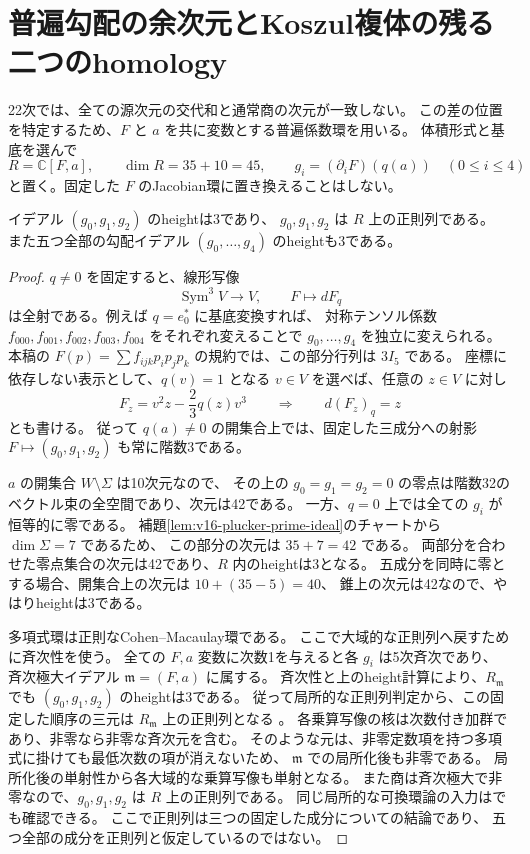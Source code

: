 \section{普遍勾配の余次元とKoszul複体の残る二つのhomology}
\label{sec:v16-universal-koszul-height}

22次では、全ての源次元の交代和と通常商の次元が一致しない。
この差の位置を特定するため、$F$ と $a$ を共に変数とする普遍係数環を用いる。
体積形式と基底を選んで
\[
 R=\mathbb C[F,a],\qquad\dim R=35+10=45,
 \qquad g_i=(\partial_iF)(q(a))\quad(0\le i\le4)
\]
と置く。固定した $F$ のJacobian環に置き換えることはしない。

\begin{proposition}[固定した三つの普遍勾配は正則列]
\label{prop:v16-universal-three-gradient-regular}
イデアル $(g_0,g_1,g_2)$ のheightは3であり、
$g_0,g_1,g_2$ は $R$ 上の正則列である。
また五つ全部の勾配イデアル $(g_0,\ldots,g_4)$ のheightも3である。
\end{proposition}

\begin{proof}
$q\ne0$ を固定すると、線形写像
\[
 \operatorname{Sym}^3V\longrightarrow V,\qquad F\longmapsto dF_q
\]
は全射である。例えば $q=e_0^*$ に基底変換すれば、
対称テンソル係数 $f_{000},f_{001},f_{002},f_{003},f_{004}$ をそれぞれ変えることで
$g_0,\ldots,g_4$ を独立に変えられる。
本稿の $F(p)=\sum f_{ijk}p_ip_jp_k$ の規約では、この部分行列は $3I_5$ である。
座標に依存しない表示として、$q(v)=1$ となる $v\in V$ を選べば、任意の $z\in V$ に対し
\[
 F_z=v^2z-\frac23q(z)v^3
 \qquad\Longrightarrow\qquad d(F_z)_q=z
\]
とも書ける。
従って $q(a)\ne0$ の開集合上では、固定した三成分への射影
$F\mapsto(g_0,g_1,g_2)$ も常に階数3である。

$a$ の開集合 $W\setminus\Sigma$ は10次元なので、
その上の $g_0=g_1=g_2=0$ の零点は階数32のベクトル束の全空間であり、次元は42である。
一方、$q=0$ 上では全ての $g_i$ が恒等的に零である。
補題\ref{lem:v16-plucker-prime-ideal}のチャートから $\dim\Sigma=7$ であるため、
この部分の次元は $35+7=42$ である。
両部分を合わせた零点集合の次元は42であり、$R$ 内のheightは3となる。
五成分を同時に零とする場合、開集合上の次元は $10+(35-5)=40$、
錐上の次元は42なので、やはりheightは3である。

多項式環は正則なCohen--Macaulay環である。
ここで大域的な正則列へ戻すために斉次性を使う。
全ての $F,a$ 変数に次数1を与えると各 $g_i$ は5次斉次であり、
斉次極大イデアル $\mathfrak m=(F,a)$ に属する。
斉次性と上のheight計算により、$R_{\mathfrak m}$ でも
$(g_0,g_1,g_2)$ のheightは3である。
従って局所的な正則列判定から、この固定した順序の三元は
$R_{\mathfrak m}$ 上の正則列となる
\cite[Corollary~3.8]{SwanMKN}。
各乗算写像の核は次数付き加群であり、非零なら非零な斉次元を含む。
そのような元は、非零定数項を持つ多項式に掛けても最低次数の項が消えないため、
$\mathfrak m$ での局所化後も非零である。
局所化後の単射性から各大域的な乗算写像も単射となる。
また商は斉次極大で非零なので、$g_0,g_1,g_2$ は $R$ 上の正則列である。
同じ局所的な可換環論の入力は\cite[Tags 00NQ, 02JN]{StacksCMRegular}でも確認できる。
ここで正則列は三つの固定した成分についての結論であり、
五つ全部の成分を正則列と仮定しているのではない。
\end{proof}

